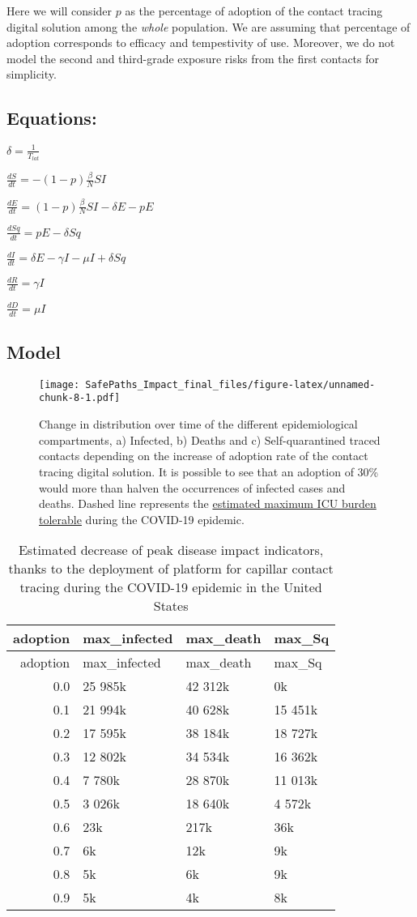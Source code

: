 \documentclass[]{article}
\begin{document}
Here we will consider \(p\) as the percentage of adoption of the contact
tracing digital solution among the \emph{whole} population. We are
assuming that percentage of adoption corresponds to efficacy and
tempestivity of use. Moreover, we do not model the second and
third-grade exposure risks from the first contacts for simplicity.

\hypertarget{equations}{%
\subsection{Equations:}\label{equations}}

\(\displaystyle \delta = \frac{1}{T_{lat}}\)

\(\displaystyle \frac{dS}{dt} = - (1-p)\frac{\beta}{N}SI\)

\(\displaystyle \frac{dE}{dt} = (1-p)\frac{\beta}{N}SI- \delta E - pE\)

\(\displaystyle \frac{dSq}{dt} = pE - \delta Sq\)

\(\displaystyle \frac{dI}{dt} = \delta E - \gamma I - \mu I + \delta Sq\)

\(\displaystyle \frac{dR}{dt} = \gamma I\)

\(\displaystyle \frac{dD}{dt} = \mu I\)

\hypertarget{model}{%
\subsection{Model}\label{model}}

\begin{figure}
\centering
\texttt{[image: SafePaths\_Impact\_final\_files/figure-latex/unnamed-chunk-8-1.pdf]}
\caption{Change in distribution over time of the different
epidemiological compartments, a) Infected, b) Deaths and c)
Self-quarantined traced contacts depending on the increase of adoption
rate of the contact tracing digital solution. It is possible to see that
an adoption of 30\% would more than halven the occurrences of infected
cases and deaths. Dashed line represents the
\href{https://www.statnews.com/2020/03/10/simple-math-alarming-answers-covid-19/}{estimated
maximum ICU burden tolerable} during the COVID-19 epidemic.}
\end{figure}

\begin{longtable}[]{@{}rlll@{}}
\caption{Estimated decrease of peak disease impact indicators, thanks to
the deployment of platform for capillar contact tracing during the
COVID-19 epidemic in the United States}\tabularnewline
\toprule
adoption & max\_infected & max\_death & max\_Sq\tabularnewline
\midrule
\endfirsthead
\toprule
adoption & max\_infected & max\_death & max\_Sq\tabularnewline
\midrule
\endhead
0.0 & 25 985k & 42 312k & 0k\tabularnewline
0.1 & 21 994k & 40 628k & 15 451k\tabularnewline
0.2 & 17 595k & 38 184k & 18 727k\tabularnewline
0.3 & 12 802k & 34 534k & 16 362k\tabularnewline
0.4 & 7 780k & 28 870k & 11 013k\tabularnewline
0.5 & 3 026k & 18 640k & 4 572k\tabularnewline
0.6 & 23k & 217k & 36k\tabularnewline
0.7 & 6k & 12k & 9k\tabularnewline
0.8 & 5k & 6k & 9k\tabularnewline
0.9 & 5k & 4k & 8k\tabularnewline
\bottomrule
\end{longtable}
\end{document}
